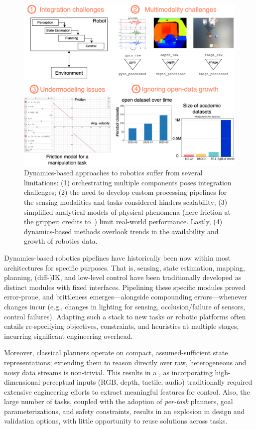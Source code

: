 \begin{figure}
    \centering
    \includegraphics[width=0.9\linewidth]{figures/ch2/ch2-classical-limitations.pdf}
    \caption{Dynamics-based approaches to robotics suffer from several limitations: (1) orchestrating multiple components poses integration challenges; (2) the need to develop custom processing pipelines for the sensing modalities and tasks considered hinders scalability; (3) simplified analytical models of physical phenomena (here friction at the gripper; credits to~\citet{antonovaReinforcementLearningPivoting2017}) limit real-world performance. Lastly, (4) dynamics-based methods overlook trends in the availability and growth of robotics data.}
    \label{fig:classical-limitations}
\end{figure}

Dynamics-based robotics pipelines have historically been  now within most architectures for specific purposes.
That is, sensing, state estimation, mapping, planning, (diff-)IK, and low-level control have been traditionally developed as distinct modules with fixed interfaces.
Pipelining these specific modules proved error-prone, and brittleness emerges---alongside compounding errors---whenever changes incur (e.g., changes in lighting for sensing, occlusion/failure of sensors, control failures).
Adapting such a stack to new tasks or robotic platforms often entails re-specifying objectives, constraints, and heuristics at multiple stages, incurring significant engineering overhead.

Moreover, classical planners operate on compact, assumed-sufficient state representations; extending them to reason directly over raw, heterogeneous and noisy data streams is non-trivial.
This results in a , as incorporating high-dimensional perceptual inputs (RGB, depth, tactile, audio) traditionally required extensive engineering efforts to extract meaningful features for control. 
Also, the large number of tasks, coupled with the adoption of \emph{per-task} planners, goal parameterizations, and safety constraints, results in an explosion in design and validation options, with little opportunity to reuse solutions across tasks.

